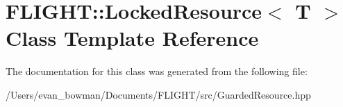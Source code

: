 \hypertarget{class_f_l_i_g_h_t_1_1_locked_resource}{}\section{F\+L\+I\+G\+HT\+:\+:Locked\+Resource$<$ T $>$ Class Template Reference}
\label{class_f_l_i_g_h_t_1_1_locked_resource}


The documentation for this class was generated from the following file\+:\begin{DoxyCompactItemize}
\item 
/\+Users/evan\+\_\+bowman/\+Documents/\+F\+L\+I\+G\+H\+T/src/Guarded\+Resource.\+hpp\end{DoxyCompactItemize}
